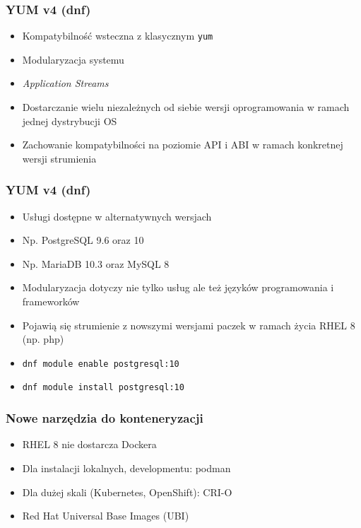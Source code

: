 \documentclass[dvipsnames,table]{beamer}
\begin{document}
\begin{frame}
\frametitle{YUM v4 (dnf)}
\begin{itemize}
	\item Kompatybilność wsteczna z klasycznym {\tt yum}
	\item Modularyzacja systemu
	\item {\em Application Streams}
	\item Dostarczanie wielu niezależnych od siebie wersji oprogramowania w ramach jednej dystrybucji OS
	\item Zachowanie kompatybilności na poziomie API i ABI w ramach konkretnej wersji strumienia
\end{itemize}
\begin{center}
\end{center}
\end{frame}

\begin{frame}
\frametitle{YUM v4 (dnf)}
\begin{itemize}
	\item Usługi dostępne w alternatywnych wersjach
	\item Np. PostgreSQL 9.6 oraz 10
	\item Np. MariaDB 10.3 oraz MySQL 8
	\item Modularyzacja dotyczy nie tylko usług ale też języków programowania i frameworków
	\item Pojawią się strumienie z nowszymi wersjami paczek w ramach życia RHEL 8 (np. php)
	\item {\tt dnf module enable postgresql:10}
	\item {\tt dnf module install postgresql:10}
\end{itemize}
\begin{center}
\end{center}
\end{frame}








%

\begin{frame}[fragile]
	\frametitle{Nowe narzędzia do konteneryzacji}
\begin{itemize}
	\item RHEL 8 nie dostarcza Dockera
	\item Dla instalacji lokalnych, developmentu: podman
	\item Dla dużej skali (Kubernetes, OpenShift): CRI-O
	\item Red Hat Universal Base Images (UBI)
\end{itemize}
\end{frame}
\end{document}
